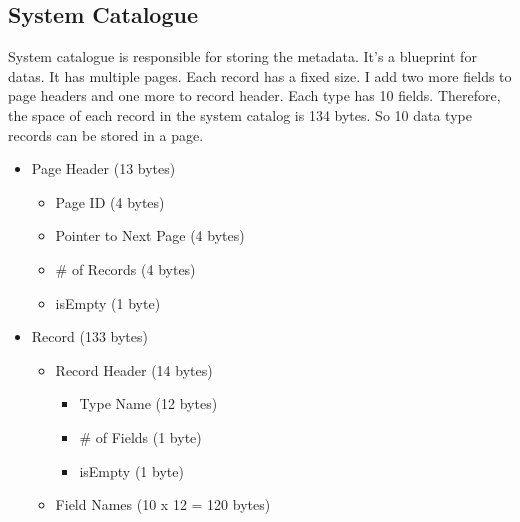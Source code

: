 \documentclass[12pt,a4paper]{article}
\begin{document}
    \subsection{System Catalogue}
        System catalogue is responsible for storing the metadata. It's a blueprint for datas. It has multiple pages. Each record has a fixed size. I add two more fields to page headers and one more to record header. Each type has 10 fields. Therefore, the space of each record in the system catalog is 134 bytes. So 10 data type records can be stored in a page.
        \begin{itemize}
          \item Page Header (13 bytes)
            \begin{itemize}
                \item Page ID (4 bytes)
                \item Pointer to Next Page (4 bytes)
                \item \# of Records (4 bytes)
                \item isEmpty (1 byte)
            \end{itemize}
          \item Record (133 bytes)
            \begin{itemize}
                 \item Record Header (14 bytes)
                    \begin{itemize}
                        \item Type Name (12 bytes)
                        \item \# of Fields (1 byte)
                        \item isEmpty (1 byte)
                    \end{itemize}
                 \item Field Names (10 x 12 = 120 bytes)
            \end{itemize}
        \end{itemize}
\end{document}
